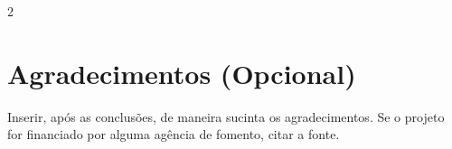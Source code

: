 \documentclass[a0,portrait]{a0poster}
\begin{document}
\begin{multicols}{2}
%
 



\section*{Agradecimentos (Opcional)}
\vspace{-1cm}
Inserir, ap\'os as conclus\~oes, de maneira sucinta os agradecimentos. Se o projeto for financiado por alguma ag\^encia de fomento, citar a fonte.




\end{multicols}
\end{document}
